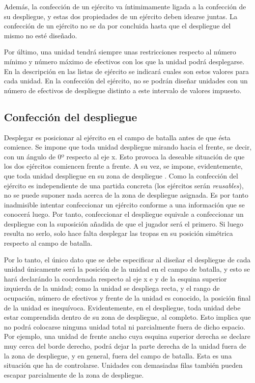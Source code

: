 Además, la confección de un ejército va íntimimamente ligada a la
confección de su despliegue, y estas dos propiedades de un ejército
deben idearse juntas. La confección de un ejército no se da por
concluida hasta que el despliegue del mismo no esté diseñado.

Por último, una unidad tendrá siempre unas restricciones respecto al
número mínimo y número máximo de efectivos con los que la unidad podrá
desplegarse. En la descripción en las listas de ejército se indicará
cuales son estos valores para cada unidad. En la confección del
ejército, no se podrán diseñar unidades con un número de efectivos de
despliegue distinto a este intervalo de valores impuesto.

\subsection*{Confección del despliegue}
\label{despliegue}
Desplegar es posicionar al ejército en el campo de batalla antes de
que ésta comience. Se impone que toda unidad despliegue mirando hacia
el frente, se decir, con un ángulo de 0º respecto al eje x. Esto
provoca la deseable situación de que los dos ejércitos comiencen
frente a frente. A su vez, se impone, evidentemente, que toda unidad
despliegue en su zona de despliegue . Como la confección del ejército
es independiente de una partida concreta (los ejércitos serán
\textit{reusables}), no se puede suponer nada acerca de la zona de
despliegue asignada. Es por tanto inadmisible intentar confeccionar un
ejército conforme a una información que se conocerá luego. Por tanto,
confeccionar el despliegue equivale a confeccionar un despliegue con
la suposición añadida de que el jugador será el primero. Si luego
resulta no serlo, solo hace falta desplegar las tropas en su posición
simétrica respecto al campo de batalla.

Por lo tanto, el único dato que se debe especificar al diseñar el
despliegue de cada unidad únicamente será la posición de la unidad en
el campo de batalla, y esto se hará declarándo la coordenada respecto
al eje x e y de la esquina superior izquierda de la unidad; como la
unidad se despliega recta, y el rango de ocupación, número de
efectivos y frente de la unidad es conocido, la posición final de la
unidad es inequívoca. Evidentemente, en el despliegue, toda unidad
debe estar comprendida dentro de su zona de despliegue, al
completo. Esto implica que no podrá colocarse ninguna unidad total ni
parcialmente fuera de dicho espacio. Por ejemplo, una unidad de frente
ancho cuya esquina superior derecha se declare muy cerca del borde
derecho, podrá dejar la parte derecha de la unidad fuera de la zona de
despliegue, y en general, fuera del campo de batalla. Esta es una
situación que ha de controlarse. Unidades con demasiadas filas también
pueden escapar parcialmente de la zona de despliegue.

